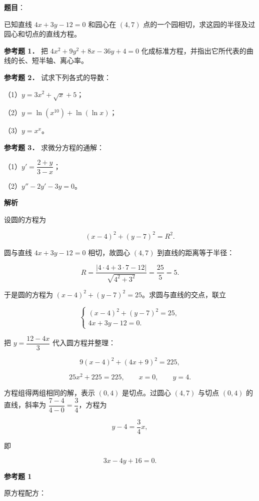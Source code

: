 \begin{answer}

\textbf{题目}：

已知直线 $4x+3y-12=0$ 和园心在 $(4,7)$ 点的一个园相切，求这园的半径及过园心和切点的直线方程。

\textbf{参考题 1．} 把 $4x^2+9y^2+8x-36y+4=0$ 化成标准方程，并指出它所代表的曲线的长、短半轴、离心率。

\textbf{参考题 2．} 试求下列各式的导数：

（1）$y=3x^2+\sqrt{x}+5$；

（2）$y=\ln(x^{10})+\ln(\ln x)$；

（3）$y=x^x$。

\textbf{参考题 3．} 求微分方程的通解：

（1）$y'=\dfrac{2+y}{3-x}$；

（2）$y''-2y'-3y=0$。

\textbf{解析}

设圆的方程为

\nopagebreak[4]
\[
(x-4)^2+(y-7)^2=R^2.
\]

圆与直线 $4x+3y-12=0$ 相切，故圆心 $(4,7)$ 到直线的距离等于半径：

\nopagebreak[4]
\[
R=\frac{|4\cdot4+3\cdot7-12|}{\sqrt{4^2+3^2}}
=\frac{25}{5}=5.
\]

于是圆的方程为 $(x-4)^2+(y-7)^2=25$。求圆与直线的交点，联立

\nopagebreak[4]
\[
\begin{cases}
(x-4)^2+(y-7)^2=25,\\
4x+3y-12=0.
\end{cases}
\]

把 $y=\dfrac{12-4x}{3}$ 代入圆方程并整理：

\nopagebreak[4]
\[
9(x-4)^2+(4x+9)^2=225,
\]

\nopagebreak[4]
\[
25x^2+225=225,
\qquad
x=0,
\qquad
y=4.
\]

方程组得两组相同的解，表示 $(0,4)$ 是切点。过圆心 $(4,7)$ 与切点 $(0,4)$ 的直线，斜率为 $\dfrac{7-4}{4-0}=\dfrac34$，方程为

\nopagebreak[4]
\[
y-4=\frac34x,
\]

即

\nopagebreak[4]
\[
3x-4y+16=0.
\]

\textbf{参考题 1}

原方程配方：


\end{answer}

